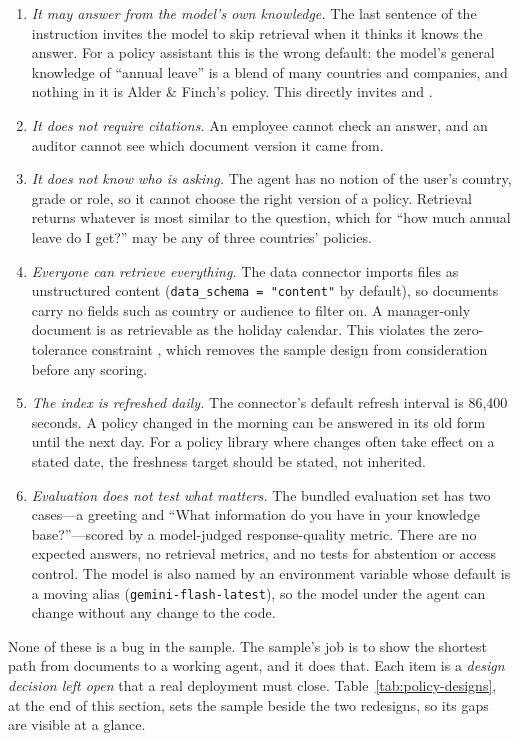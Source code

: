\begin{enumerate}[itemsep=2pt]
  \item \emph{It may answer from the model's own knowledge.} The last sentence of the instruction invites the model to skip retrieval when it thinks it knows the answer. For a policy assistant this is the wrong default: the model's general knowledge of ``annual leave'' is a blend of many countries and companies, and nothing in it is Alder \& Finch's policy. This directly invites  and .
  \item \emph{It does not require citations.} An employee cannot check an answer, and an auditor cannot see which document version it came from.
  \item \emph{It does not know who is asking.} The agent has no notion of the user's country, grade or role, so it cannot choose the right version of a policy. Retrieval returns whatever is most similar to the question, which for ``how much annual leave do I get?'' may be any of three countries' policies.
  \item \emph{Everyone can retrieve everything.} The data connector imports files as unstructured content (\texttt{data\_schema = "content"} by default), so documents carry no fields such as country or audience to filter on. A manager-only document is as retrievable as the holiday calendar. This violates the zero-tolerance constraint , which removes the sample design from consideration before any scoring.
  \item \emph{The index is refreshed daily.} The connector's default refresh interval is 86{,}400 seconds. A policy changed in the morning can be answered in its old form until the next day. For a policy library where changes often take effect on a stated date, the freshness target should be stated, not inherited.
  \item \emph{Evaluation does not test what matters.} The bundled evaluation set has two cases---a greeting and ``What information do you have in your knowledge base?''---scored by a model-judged response-quality metric. There are no expected answers, no retrieval metrics, and no tests for abstention or access control. The model is also named by an environment variable whose default is a moving alias (\texttt{gemini-flash-latest}), so the model under the agent can change without any change to the code.
\end{enumerate}

None of these is a bug in the sample. The sample's job is to show the shortest path from documents to a working agent, and it does that. Each item is a \emph{design decision left open} that a real deployment must close. Table~\ref{tab:policy-designs}, at the end of this section, sets the sample beside the two redesigns, so its gaps are visible at a glance.

